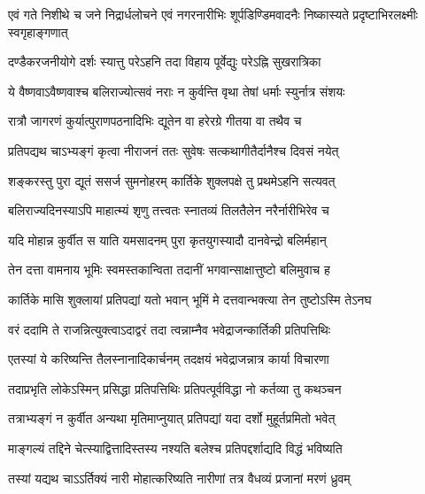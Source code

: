 \threelineshloka
{एवं गते निशीथे च जने निद्रार्धलोचने}
{एवं नगरनारीभिः शूर्पडिण्डिमवादनैः}
{निष्कास्यते प्रदृष्टाभिरलक्ष्मीः स्वगृहाङ्गणात्} %

\twolineshloka
{दण्डैकरजनीयोगे दर्शः स्यात्तु परेऽहनि}
{तदा विहाय पूर्वेद्युः परेऽह्नि सुखरात्रिका} %

\twolineshloka
{ये वैष्णवाऽवैष्णवाश्च बलिराज्योत्सवं नराः}
{न कुर्वन्ति वृथा तेषां धर्माः स्युर्नात्र संशयः} %

\twolineshloka
{रात्रौ जागरणं कुर्यात्पुराणपठनादिभिः}
{द्यूतेन वा हरेरग्रे गीतया वा तथैव च} %





\twolineshloka
{प्रतिपद्यथ चाऽभ्यङ्गं कृत्वा नीराजनं ततः}
{सुवेषः सत्कथागीतैर्दानैश्च दिवसं नयेत्} %

\twolineshloka
{शङ्करस्तु पुरा द्यूतं ससर्ज सुमनोहरम्}
{कार्तिके शुक्लपक्षे तु प्रथमेऽहनि सत्यवत्} %

\twolineshloka
{बलिराज्यदिनस्याऽपि माहात्म्यं शृणु तत्त्वतः}
{स्नातव्यं तिलतैलेन नरैर्नारीभिरेव च} %

\twolineshloka
{यदि मोहान्न कुर्वीत स याति यमसादनम्}
{पुरा कृतयुगस्यादौ दानवेन्द्रो बलिर्महान्} %

\twolineshloka
{तेन दत्ता वामनाय भूमिः स्वमस्तकान्विता}
{तदानीं भगवान्साक्षात्तुष्टो बलिमुवाच ह} %

\twolineshloka
{कार्तिके मासि शुक्लायां प्रतिपद्यां यतो भवान्}
{भूमिं मे दत्तवान्भक्त्या तेन तुष्टोऽस्मि तेऽनघ} %

\twolineshloka
{वरं ददामि ते राजन्नित्युक्त्वाऽदाद्वरं तदा}
{त्वन्नाम्नैव भवेद्राजन्कार्तिकी प्रतिपत्तिथिः} %

\twolineshloka
{एतस्यां ये करिष्यन्ति तैलस्नानादिकार्चनम्}
{तदक्षयं भवेद्राजन्नात्र कार्या विचारणा} %

\twolineshloka
{तदाप्रभृति लोकेऽस्मिन् प्रसिद्धा प्रतिपत्तिथिः}
{प्रतिपत्पूर्वविद्धा नो कर्तव्या तु कथञ्चन} %

\twolineshloka
{तत्राभ्यङ्गं न कुर्वीत अन्यथा मृतिमाप्नुयात्}
{प्रतिपद्यां यदा दर्शो मुहूर्तप्रमितो भवेत्} %

\twolineshloka
{माङ्गल्यं तद्दिने चेत्स्याद्वित्तादिस्तस्य नश्यति}
{बलेश्च प्रतिपद्दर्शाद्यदि विद्धं भविष्यति} %

\twolineshloka
{तस्यां यद्यथ चाऽऽर्तिक्यं नारी मोहात्करिष्यति}
{नारीणां तत्र वैधव्यं प्रजानां मरणं ध्रुवम्} %

